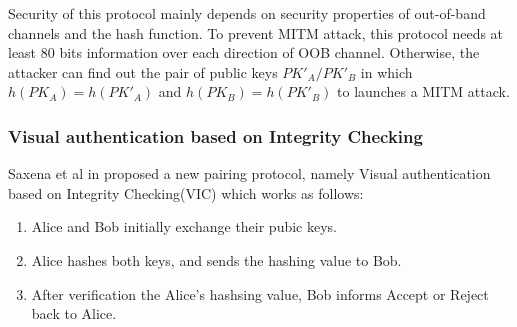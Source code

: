 \begin{center}
\end{center}

Security of this protocol mainly depends on security properties of out-of-band channels and the hash function. To prevent MITM attack, this protocol needs at least 80 bits information over each direction of OOB channel. Otherwise, the attacker can find out the pair of public keys $PK'_A/PK'_B$ in which $h(PK_A) = h(PK'_A)$ and $h(PK_B) = h(PK'_B)$ to launches a MITM attack.

\subsubsection{Visual authentication based on Integrity Checking}

Saxena et al in \cite{1624021} proposed a new pairing protocol, namely Visual authentication based on Integrity Checking(VIC) which works as follows:

\begin{enumerate}
\item Alice and Bob initially exchange their pubic keys.
\item Alice hashes both keys, and sends the hashing value to Bob. 
\item After verification the Alice's hashsing value, Bob informs Accept or Reject back to Alice. 
\end{enumerate}

